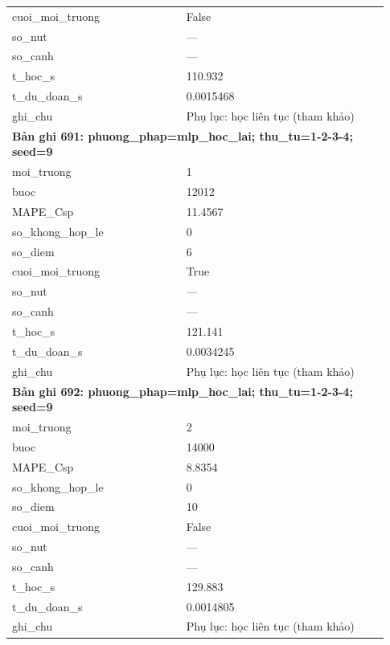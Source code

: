 \begin{longtable}{p{0.43\linewidth}p{0.50\linewidth}}
cuoi\_\allowbreak moi\_\allowbreak truong & False \\
so\_\allowbreak nut & — \\
so\_\allowbreak canh & — \\
t\_\allowbreak hoc\_\allowbreak s & 110.932 \\
t\_\allowbreak du\_\allowbreak doan\_\allowbreak s & 0.0015468 \\
ghi\_\allowbreak chu & Phụ lục: học liên tục (tham khảo) \\
\midrule
\multicolumn{2}{p{0.95\linewidth}}{\textbf{Bản ghi 691: phuong\_phap=mlp\_hoc\_lai; thu\_tu=1-2-3-4; seed=9}} \\
moi\_\allowbreak truong & 1 \\
buoc & 12012 \\
MAPE\_\allowbreak Csp & 11.4567 \\
so\_\allowbreak khong\_\allowbreak hop\_\allowbreak le & 0 \\
so\_\allowbreak diem & 6 \\
cuoi\_\allowbreak moi\_\allowbreak truong & True \\
so\_\allowbreak nut & — \\
so\_\allowbreak canh & — \\
t\_\allowbreak hoc\_\allowbreak s & 121.141 \\
t\_\allowbreak du\_\allowbreak doan\_\allowbreak s & 0.0034245 \\
ghi\_\allowbreak chu & Phụ lục: học liên tục (tham khảo) \\
\midrule
\multicolumn{2}{p{0.95\linewidth}}{\textbf{Bản ghi 692: phuong\_phap=mlp\_hoc\_lai; thu\_tu=1-2-3-4; seed=9}} \\
moi\_\allowbreak truong & 2 \\
buoc & 14000 \\
MAPE\_\allowbreak Csp & 8.8354 \\
so\_\allowbreak khong\_\allowbreak hop\_\allowbreak le & 0 \\
so\_\allowbreak diem & 10 \\
cuoi\_\allowbreak moi\_\allowbreak truong & False \\
so\_\allowbreak nut & — \\
so\_\allowbreak canh & — \\
t\_\allowbreak hoc\_\allowbreak s & 129.883 \\
t\_\allowbreak du\_\allowbreak doan\_\allowbreak s & 0.0014805 \\
ghi\_\allowbreak chu & Phụ lục: học liên tục (tham khảo) \\

\end{longtable}
